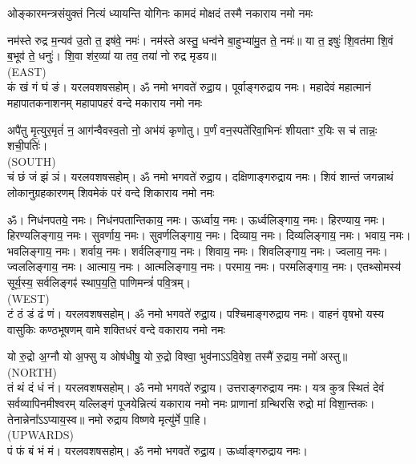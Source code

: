


\twolineshloka
{ओङ्कारमन्त्रसंयुक्तं नित्यं ध्यायन्ति योगिनः}
{कामदं मोक्षदं तस्मै नकाराय नमो नमः}

नम॑स्ते रुद्र म॒न्यव॑ उ॒तो त॒ इष॑वे॒ नमः॑। नम॑स्ते अस्तु॒ धन्व॑ने बा॒हुभ्या॑मु॒त ते॒ नमः॑॥ या त॒ इषुः॑ शि॒वत॑मा शि॒वं ब॒भूव॑ ते॒ धनुः॑। शि॒वा श॑र॒व्या॑ या तव॒ तया॑ नो रुद्र मृडय॥\\
{\scriptsize (EAST)}\\
कं खं गं घं ङं। यरलवशषसहोम्। ॐ नमो भगवते॑ रुद्रा॒य। पूर्वाङ्गरुद्राय नमः।
\medskip
\twolineshloka
{महादेवं महात्मानं महापातकनाशनम्}
{महापापहरं वन्दे मकाराय नमो नमः}

अपै॑तु मृ॒त्युर॒मृतं॑ न॒ आग॑न्वैवस्व॒तो नो॒ अभ॑यं कृणोतु।
प॒र्णं वन॒स्पते॑रिवा॒भिनः॑ शीयताꣳ र॒यिः स च॑ तान्नः॒ शची॒पतिः॑।\\
{\scriptsize (SOUTH)}\\
चं छं जं झं ञं। यरलवशषसहोम्। ॐ नमो भगवते॑ रुद्रा॒य। दक्षिणाङ्गरुद्राय नमः।
\medskip
\twolineshloka
{शिवं शान्तं जगन्नाथं लोकानुग्रहकारणम्}
{शिवमेकं परं वन्दे शिकाराय नमो नमः}

ॐ। निध॑नपतये॒ नमः। निध॑नपतान्तिकाय॒ नमः। ऊर्ध्वाय॒ नमः। ऊर्ध्वलिङ्गाय॒ नमः। हिरण्याय॒ नमः। हिरण्यलिङ्गाय॒ नमः। सुवर्णाय॒ नमः। सुवर्णलिङ्गाय॒ नमः। दिव्याय॒ नमः। दिव्यलिङ्गाय॒ नमः। भवाय॒ नमः। भवलिङ्गाय॒ नमः। शर्वाय॒ नमः। शर्वलिङ्गाय॒ नमः। शिवाय॒ नमः। शिवलिङ्गाय॒ नमः। ज्वलाय॒ नमः। ज्वललिङ्गाय॒ नमः। आत्माय॒ नमः। आत्मलिङ्गाय॒ नमः। परमाय॒ नमः। परमलिङ्गाय॒ नमः। एतथ्सोमस्य॑ सूर्य॒स्य॒ सर्वलिङ्गꣴ॑ स्थाप॒य॒ति॒ पाणिमन्त्रं॑ पवि॒त्रम्।\\
{\scriptsize (WEST)}\\
टं ठं डं ढं णं। यरलवशषसहोम्। ॐ नमो भगवते॑ रुद्रा॒य। पश्चिमाङ्गरुद्राय नमः।
\medskip
\twolineshloka
{वाहनं वृषभो यस्य वासुकिः कण्ठभूषणम्}
{वामे शक्तिधरं वन्दे वकाराय नमो नमः}

यो रु॒द्रो अ॒ग्नौ यो अ॒फ्सु य ओष॑धीषु॒ यो रु॒द्रो विश्वा॒ भुव॑नाऽऽवि॒वेश॒ तस्मै॑ रु॒द्राय॒ नमो॑ अस्तु॥\\
{\scriptsize (NORTH)}\\
तं थं दं धं नं। यरलवशषसहोम्। ॐ नमो भगवते॑ रुद्रा॒य। उत्तराङ्गरुद्राय नमः।
\medskip
\twolineshloka
{यत्र कुत्र स्थितं देवं सर्वव्यापिनमीश्वरम्}
{यल्लिङ्गं पूजयेन्नित्यं यकाराय नमो नमः}
प्राणानां ग्रन्थिरसि रुद्रो मा॑ विशा॒न्तकः। तेनान्नेना᳚\-ऽऽप्याय॒स्व॥ नमो रुद्राय विष्णवे मृत्यु॑र्मे पा॒हि।\\
{\scriptsize (UPWARDS)}\\
पं फं बं भं मं। यरलवशषसहोम्। ॐ नमो भगवते॑ रुद्रा॒य। ऊर्ध्वाङ्गरुद्राय नमः।

